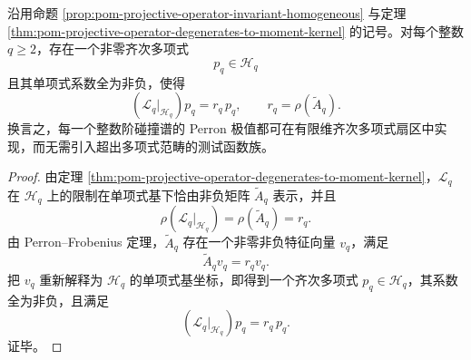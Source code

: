 \begin{theorem}\label{thm:xi-projective-moment-homogeneous-polynomial-perron-extremizer}
沿用命题 \ref{prop:pom-projective-operator-invariant-homogeneous} 与定理 \ref{thm:pom-projective-operator-degenerates-to-moment-kernel} 的记号。对每个整数 \(q\ge 2\)，存在一个非零齐次多项式
\[
p_q\in \mathcal H_q
\]
且其单项式系数全为非负，使得
\[
(\mathcal L_q|_{\mathcal H_q})p_q=r_q\,p_q,
\qquad
r_q=\rho(\widetilde A_q).
\]
换言之，每一个整数阶碰撞谱的 Perron 极值都可在有限维齐次多项式扇区中实现，而无需引入超出多项式范畴的测试函数族。
\end{theorem}
\begin{proof}
由定理 \ref{thm:pom-projective-operator-degenerates-to-moment-kernel}，\(\mathcal L_q\) 在 \(\mathcal H_q\) 上的限制在单项式基下恰由非负矩阵 \(\widetilde A_q\) 表示，并且
\[
\rho(\mathcal L_q|_{\mathcal H_q})=\rho(\widetilde A_q)=r_q.
\]
由 Perron--Frobenius 定理，\(\widetilde A_q\) 存在一个非零非负特征向量 \(v_q\)，满足
\[
\widetilde A_qv_q=r_qv_q.
\]
把 \(v_q\) 重新解释为 \(\mathcal H_q\) 的单项式基坐标，即得到一个齐次多项式 \(p_q\in \mathcal H_q\)，其系数全为非负，且满足
\[
(\mathcal L_q|_{\mathcal H_q})p_q=r_q\,p_q.
\]
证毕。
\end{proof}


